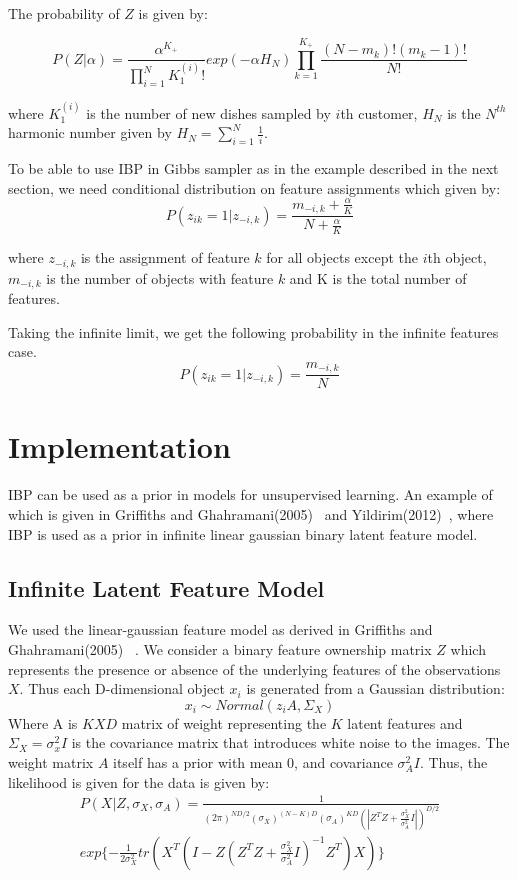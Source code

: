 \documentclass{article}
\begin{document}
The probability of $Z$ is given by:

\begin{equation}
P(Z|\alpha) =\frac{\alpha^{K_+}}{\prod_{i=1}^{N}K_1^{(i)}!}exp(-\alpha H_N)\prod_{k=1}^{K_+}\frac{(N-m_k)!(m_k-1)!}{N!} 
\end{equation}

where $K_1^{(i)}$ is the number of new dishes sampled by $i$th customer, $H_N$ is the $N^{th}$ harmonic number given by $H_N=\sum_{i=1}^{N} \frac{1}{i}$.

To be able to use IBP in Gibbs sampler as in the example described in the next section, we need conditional distribution on feature assignments which given by:
\begin{equation}\label{eq:zprob}
P(z_{ik}=1|z_{-i,k}) = \frac{m_{-i,k}+\frac{\alpha}{K}}{N+\frac{\alpha}{K}}
\end{equation}

where $z_{-i,k}$ is the assignment of feature $k$ for all objects except the $i$th object, $m_{-i,k}$ is the number of objects with feature $k$ and K is the total number of features.

Taking the infinite limit, we get the following probability in the infinite features case.
\begin{equation}
P(z_{ik}=1|z_{-i,k}) = \frac{m_{-i,k}}{N}
\end{equation}

\section{Implementation}
IBP can be used as a prior in models for unsupervised learning. An example of which is given in Griffiths and Ghahramani(2005)~\cite{griffiths} and Yildirim(2012)~\cite{yildirim}, where IBP is used as a prior in infinite linear gaussian binary latent feature model.

\subsection{Infinite Latent Feature Model}
We used the linear-gaussian feature model as derived in Griffiths and Ghahramani(2005) ~\cite{griffiths}. We consider a binary feature ownership matrix $Z$ which represents the presence or absence of the underlying features of the observations $X$. Thus each D-dimensional object $x_i$ is generated from a Gaussian distribution:
\[
x_i \sim Normal(z_iA, \Sigma_X)
\]
Where A is $KXD$ matrix of weight representing the $K$ latent features and $\Sigma_X= \sigma^2_xI$ is the covariance matrix that introduces white noise to the images. The weight matrix $A$ itself has a prior with mean 0, and covariance $\sigma^2_AI$. Thus, the likelihood is given for the data is given by:
\begin{multline}\label{eq:lik}
P(X|Z,\sigma_X, \sigma_A) = \frac{1}{(2 \pi)^{ND/2} (\sigma_X)^{(N-K)D}(\sigma_A)^{KD}(|Z^TZ+\frac{\sigma_X^2}{\sigma_A^2}I|)^{D/2}}\\
exp\{-\frac{1}{2\sigma_X^2}tr(X^T(I-Z(Z^TZ+\frac{\sigma_X^2}{\sigma_A^2}I)^{-1}Z^T)X)\}
\end{multline}
\end{document}
